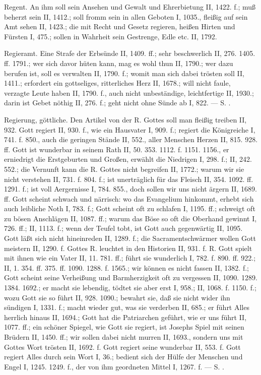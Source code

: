 Regent. An ihm soll sein Ansehen und Gewalt und Ehrerbietung II, 1422. f.; muß beherzt sein II, 1412.; soll fromm sein in allen Geboten I, 1035., fleißig auf sein Amt sehen II, 1423.; die mit Recht und Gesetz regieren, heißen Hirten und Fürsten I, 475.; sollen in Wahrheit sein Gestrenge, Edle etc. II, 1792.

Regieramt. Eine Strafe der Erbsünde II, 1409. ff.; sehr beschwerlich II, 276. 1405. ff. 1791.; wer sich davor hüten kann, mag es wohl thun II, 1790.; wer dazu berufen ist, soll es verwalten II, 1790. f.; womit man sich dabei trösten soll II, 1411.; erfordert ein gottseliges, ritterliches Herz II, 1678.; will nicht faule, verzagte Leute haben II, 1790. f., auch nicht unbeständige, leichtfertige II, 1930.; darin ist Gebet nöthig II, 276. f.; geht nicht ohne Sünde ab I, 822. — S. .

Regierung, göttliche. Den Artikel von der R. Gottes soll man fleißig treiben II, 932. Gott regiert  II, 930. f., wie ein Hausvater I, 909. f.; regiert die Königreiche I, 741. f. 850., auch die geringen Stände II, 552., aller Menschen Herzen II, 815. 928. ff. Gott ist wunderbar in seinem Rath II, 50. 353. 1112. f. 1151. 1156., er erniedrigt die Erstgeburten und Großen, erwählt die Niedrigen I, 298. f.; II, 242. 552.; die Vernunft kann die R. Gottes nicht begreifen II, 1772.; warum wir sie nicht verstehen II, 731. f. 804. f.; ist unerträglich für das Fleisch II, 354. 1092. ff. 1291. f.; ist voll Aergernisse I, 784. 855., doch sollen wir uns nicht ärgern II, 1689. ff. Gott scheint schwach und närrisch: wo das Evangelium hinkommt, erhebt sich auch leibliche Noth I, 783. f.; Gott scheint oft zu schlafen I, 1195. ff.; schweigt oft zu bösen Anschlägen II, 1087. ff.; warum das Böse so oft die Oberhand gewinnt I, 726. ff.; II, 1113. f.; wenn der Teufel tobt, ist Gott auch gegenwärtig II, 1095. Gott läßt sich nicht hineinreden II, 1289. f.; die Sacramentschwärmer wollen Gott meistern II, 1290. f. Gottes R. leuchtet in den Historien II, 931. f. R.  Gott spielt mit ihnen wie ein Vater II, 11. 781. ff.; führt sie wunderlich I, 782. f. 890. ff. 922.; II, 1. 354. ff. 375. ff. 1090. 1288. f. 1565.; wir können es nicht fassen II, 1382. f.; Gott scheint seine Verheißung und Barmherzigkeit oft zu vergessen II, 1090. 1289. 1384. 1692.; er macht sie lebendig, tödtet sie aber erst I, 958.; II, 1068. f. 1150. f.; wozu Gott sie so führt II, 928. 1090.; bewahrt sie, daß sie nicht wider ihn sündigen I, 1331. f.; macht wieder gut, was sie verderben II, 685.; er führt Alles herrlich hinaus II, 1694.; Gott hat die Patriarchen geführt, wie er uns führt II, 1077. ff.; ein schöner Spiegel, wie Gott sie regiert, ist Josephs Spiel mit seinen Brüdern II, 1450. ff.; wir sollen dabei nicht murren II, 1693., sondern uns mit Gottes Wort trösten II, 1692. f. Gott regiert seine  wunderbar II, 553. f.  Gott regiert Alles durch sein Wort I, 36.; bedient sich der Hülfe der Menschen und Engel I, 1245. 1249. f., der von ihm geordneten Mittel I, 1267. f. — S. .

